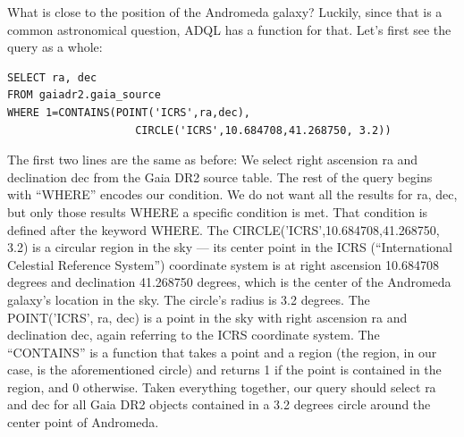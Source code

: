 \documentclass[twocolumn,apj]{openjournal}
\begin{document}
What is close to the position of the Andromeda galaxy? Luckily, since that is a common astronomical question, ADQL has a function for that. Let's first see the query as a whole:
\begin{lstlisting}
SELECT ra, dec
FROM gaiadr2.gaia_source
WHERE 1=CONTAINS(POINT('ICRS',ra,dec),
                    CIRCLE('ICRS',10.684708,41.268750, 3.2))
\end{lstlisting}
The first two lines are the same as before: We select right ascension ra and declination dec from the Gaia DR2 source table. The rest of the query begins with ``WHERE'' encodes our condition. We do not want all the results for ra, dec, but only those results WHERE a specific condition is met. That condition is defined after the keyword WHERE. The CIRCLE('ICRS',10.684708,41.268750, 3.2) is a circular region in the sky --- its center point in the ICRS (``International Celestial Reference System'') coordinate system is at right ascension 10.684708 degrees and declination 41.268750 degrees, which is the center of the Andromeda galaxy's location in the sky. The circle's radius is 3.2 degrees. The POINT('ICRS', ra, dec) is a point in the sky with right ascension ra and declination dec, again referring to the ICRS coordinate system. The ``CONTAINS'' is a function that takes a point and a region (the region, in our case, is the aforementioned circle) and returns 1 if the point is contained in the region, and 0 otherwise. Taken everything together, our query should select ra and dec for all Gaia DR2 objects contained in a 3.2 degrees circle around the center point of Andromeda.
\end{document}
